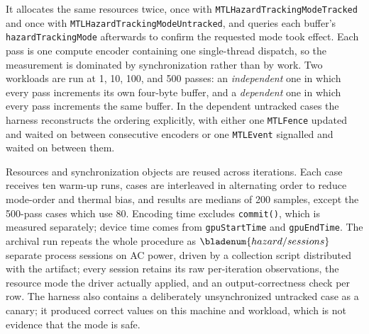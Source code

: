 \documentclass[10pt,twocolumn]{article}
\begin{document}
It allocates the same resources twice, once with
\texttt{MTLHazardTrackingModeTracked} and once with
\texttt{MTLHazardTrackingModeUntracked}, and queries each buffer's
\texttt{hazardTrackingMode} afterwards to confirm the requested mode took
effect. Each pass is one compute encoder containing one single-thread dispatch,
so the measurement is dominated by synchronization rather than by work. Two
workloads are run at 1, 10, 100, and 500 passes: an \emph{independent} one in
which every pass increments its own four-byte buffer, and a \emph{dependent}
one in which every pass increments the same buffer. In the dependent untracked
cases the harness reconstructs the ordering explicitly, with either one
\texttt{MTLFence} updated and waited on between consecutive encoders or one
\texttt{MTLEvent} signalled and waited on between them.

Resources and synchronization objects are reused across iterations. Each case
receives ten warm-up runs, cases are interleaved in alternating order to reduce
mode-order and thermal bias, and results are medians of 200 samples, except the
500-pass cases which use 80. Encoding time excludes \texttt{commit()}, which is
measured separately; device time comes from \texttt{gpuStartTime} and
\texttt{gpuEndTime}. The archival run repeats the whole procedure as
$\bladenum{hazard/sessions}$ separate process sessions on AC power, driven by
a collection script distributed with the artifact; every session retains its
raw per-iteration observations, the resource mode the driver actually
applied, and an output-correctness check per row. The harness also contains a
deliberately unsynchronized untracked case as a canary; it produced correct
values on this machine and workload, which is not evidence that the mode is
safe.
\end{document}
